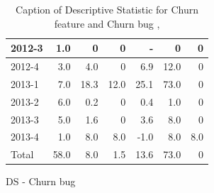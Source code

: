 \documentclass[UKenglish]{ifimaster}  %
\begin{document}
\begin{appendices}
\begin{table}[!htbp]
\begin{adjustwidth}{-2.5cm}{}
\begin{subfigure}[b]{0.3\textwidth}
{\begin{tabular}{ | l | r | r | r | r | r | r | }
2012-3 & 1.0 & 0 & 0 & - & 0 & 0\\ \hline
2012-4 & 3.0 & 4.0 & 0 & 6.9 & 12.0 & 0\\ \hline
2013-1 & 7.0 & 18.3 & 12.0 & 25.1 & 73.0 & 0\\ \hline
2013-2 & 6.0 & 0.2 & 0 & 0.4 & 1.0 & 0\\ \hline
2013-3 & 5.0 & 1.6 & 0 & 3.6 & 8.0 & 0\\ \hline
2013-4 & 1.0 & 8.0 & 8.0 & -1.0 & 8.0 & 8.0\\ \hline
Total & 58.0 & 8.0 & 1.5 & 13.6 & 73.0 & 0\\ \hline
\end{tabular}
}
\caption{DS - Churn bug}
 \label{DS:CB:8}
\end{subfigure}
\end{adjustwidth}
\caption[Optional caption for list of figures]{Caption of Descriptive Statistic for Churn feature and Churn bug  , }
\label{DS:8:4} %
\end{table}




\end{appendices}
\end{document}
